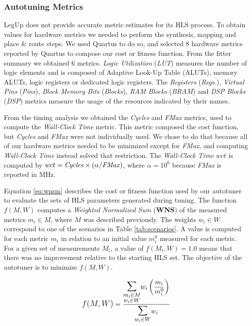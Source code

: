 \subsubsection{Autotuning Metrics}
\label{sec:metrics}

LegUp does not provide accurate metric estimates for its HLS process. To obtain
values for hardware metrics we needed to perform the synthesis, mapping and
place \& route steps. We used Quartus to do so, and selected 8 hardware metrics
reported by Quartus to compose our cost or fitness function. From the fitter
summary we obtained 6 metrics. \textit{Logic Utilization} (\textit{LUT})
measures the number of logic elements and is composed of Adaptive Look-Up Table
(ALUTs), memory ALUTs, logic registers or dedicated logic registers.  The
\textit{Registers} (\textit{Regs.}), \textit{Virtual Pins} (\textit{Pins}),
\textit{Block Memory Bits} (\textit{Blocks}), \textit{RAM Blocks}
(\textit{BRAM}) and \textit{DSP Blocks} (\textit{DSP}) metrics measure the
usage of the resources indicated by their names.

From the timing analysis we obtained the \textit{Cycles} and \textit{FMax}
metrics, used to compute the \textit{Wall-Clock Time} metric. This metric
composed the cost function, but \textit{Cycles} and \textit{FMax} were not
individually used. We chose to do that because all of our hardware metrics
needed to be minimized except for \textit{FMax}, and computing
\textit{Wall-Clock Time} instead solved that restriction.  The
\textit{Wall-Clock Time} $wct$ is computed by $wct = \text{\textit{Cycles}}
\times (\alpha / \text{\textit{FMax}})$, where $\alpha = 10^6$ because
\textit{FMax} is reported in MHz.

Equation \ref{eq:wnsm} describes the cost or fitness function used by our
autotuner to evaluate the sets of HLS parameters generated during tuning.  The
function $f(M, W)$ computes a \textit{Weighted Normalized Sum} (\textbf{WNS})
of the measured metrics $m_i \in M$, where $M$ was described previously.  The
weights $w_i \in W$ correspond to one of the scenarios in Table
\ref{tab:scenarios}. A value is computed for each metric $m_i$ in relation to
an initial value $m_{i}^{0}$ measured for each metric.  For a given set of
measurements $M_t$, a value of $f(M_t, W) = 1.0$ means that there was no
improvement relative to the starting HLS set. The objective of the autotuner is
to minimize $f(M, W)$.

\begin{align} \label{eq:wnsm}
    \mathlarger{f(M, W)} = \frac{\mathlarger{\mathlarger{\mathlarger{\sum}}}\limits_{\substack{m_i \in M \\ w_i \in W}}{w_i\left(\dfrac{m_i}{m_{i}^{0}}\right)}}{\mathlarger{\mathlarger{\mathlarger{\sum}}}\limits_{w_i \in W}{w_i}}
\end{align}

